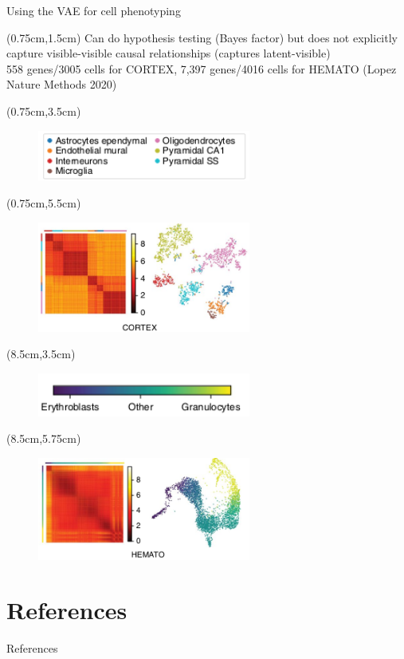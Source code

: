 \documentclass[aspectratio=1610]{beamer}					%
\begin{document}
\begin{frame}{Using the VAE for cell phenotyping}

\begin{textblock*}{15cm}(0.75cm,1.5cm)
Can do hypothesis testing (Bayes factor) but does not explicitly capture visible-visible causal relationships (captures latent-visible)\\
\vspace{0.1in}
558 genes/3005 cells for CORTEX, 7,397 genes/4016 cells for HEMATO (Lopez Nature Methods 2020)
\end{textblock*}
\begin{textblock*}{7cm}(0.75cm,3.5cm)
\begin{figure}
\includegraphics[width=7cm]{cortex-legend.png}
\end{figure}
\end{textblock*}
\begin{textblock*}{7cm}(0.75cm,5.5cm)
\begin{figure}
\includegraphics[width=7cm]{cortex.png}
\end{figure}
\end{textblock*}
\begin{textblock*}{7cm}(8.5cm,3.5cm)
\begin{figure}
\includegraphics[width=7cm]{hemato-legend.png}
\end{figure}
\end{textblock*}
\begin{textblock*}{7cm}(8.5cm,5.75cm)
\begin{figure}
\includegraphics[width=7cm]{hemato.png}
\end{figure}
\end{textblock*}
\end{frame}

\section{References}

\begin{frame}[allowframebreaks]{References}
	\tiny
	
\end{frame}
\end{document}
